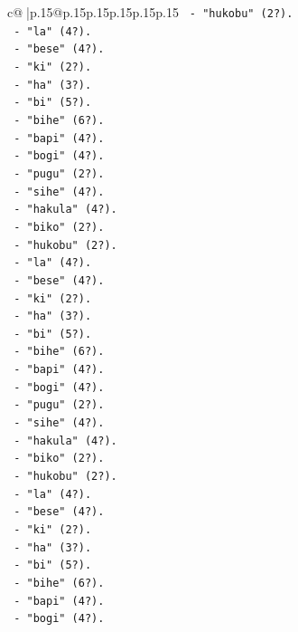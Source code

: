 \documentclass{article}
\begin{document}
{\begin{supertabular}{c@{$\;$}|p{.15\linewidth}@{}p{.15\linewidth}p{.15\linewidth}p{.15\linewidth}p{.15\linewidth}p{.15\linewidth}}
{{{\texttt{       {-} "hukobu" (2?).} \\
\texttt{       {-} "la" (4?).} \\
\texttt{       {-} "bese" (4?).} \\
\texttt{       {-} "ki" (2?).} \\
\texttt{       {-} "ha" (3?).} \\
\texttt{       {-} "bi" (5?).} \\
\texttt{       {-} "bihe" (6?).} \\
\texttt{       {-} "bapi" (4?).} \\
\texttt{       {-} "bogi" (4?).} \\
\texttt{       {-} "pugu" (2?).} \\
\texttt{       {-} "sihe" (4?).} \\
\texttt{       {-} "hakula" (4?).} \\
\texttt{       {-} "biko" (2?).} \\
\texttt{       {-} "hukobu" (2?).} \\
\texttt{       {-} "la" (4?).} \\
\texttt{       {-} "bese" (4?).} \\
\texttt{       {-} "ki" (2?).} \\
\texttt{       {-} "ha" (3?).} \\
\texttt{       {-} "bi" (5?).} \\
\texttt{       {-} "bihe" (6?).} \\
\texttt{       {-} "bapi" (4?).} \\
\texttt{       {-} "bogi" (4?).} \\
\texttt{       {-} "pugu" (2?).} \\
\texttt{       {-} "sihe" (4?).} \\
\texttt{       {-} "hakula" (4?).} \\
\texttt{       {-} "biko" (2?).} \\
\texttt{       {-} "hukobu" (2?).} \\
\texttt{       {-} "la" (4?).} \\
\texttt{       {-} "bese" (4?).} \\
\texttt{       {-} "ki" (2?).} \\
\texttt{       {-} "ha" (3?).} \\
\texttt{       {-} "bi" (5?).} \\
\texttt{       {-} "bihe" (6?).} \\
\texttt{       {-} "bapi" (4?).} \\
\texttt{       {-} "bogi" (4?).} \\
}}}
\end{supertabular}}
\end{document}
